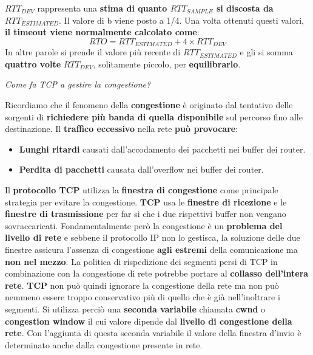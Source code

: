 \documentclass[11pt,a4paper]{article}
\theoremstyle{definition}
\begin{document}
$RTT_{DEV}$ rappresenta una \textbf{stima di quanto $RTT_{SAMPLE}$ si discosta da $RTT_{ESTIMATED}$}. Il valore di b viene posto a 1/4. Una volta ottenuti questi valori, \textbf{il timeout viene normalmente calcolato come}:
\begin{equation}
	RTO = RTT_{ESTIMATED} + 4 \times RTT_{DEV}
\end{equation}
In altre parole si prende il valore più recente di $RTT_{ESTIMATED}$ e gli si somma \textbf{quattro volte} $RTT_{DEV}$, solitamente piccolo, per \textbf{equilibrarlo}.
\newpage
\begin{flushleft}
	\textit{Come fa TCP a gestire la congestione?}
\end{flushleft}
Ricordiamo che il fenomeno della \textbf{congestione} è originato dal tentativo delle
sorgenti di \textbf{richiedere più banda di quella disponibile} sul percorso fino alle destinazione.\newline
Il \textbf{traffico eccessivo} nella rete \textbf{può provocare}:
\begin{itemize}
	\item \textbf{Lunghi ritardi} causati dall'accodamento dei pacchetti nei buffer dei router.
	\item \textbf{Perdita di pacchetti} causata dall'overflow nei buffer dei router.
\end{itemize}
Il \textbf{protocollo TCP} utilizza la \textbf{finestra di congestione} come principale strategia per evitare la congestione.\newline\newline
\textbf{TCP} usa le \textbf{finestre di ricezione} e le \textbf{finestre di trasmissione} per far sì che i due rispettivi buffer non vengano sovraccaricati. Fondamentalmente però la congestione è un \textbf{problema del livello di rete} e sebbene il protocollo IP non lo gestisca, la soluzione delle due finestre assicura l'assenza di congestione \textbf{agli estremi} della comunicazione ma \textbf{non nel mezzo}. La politica di rispedizione dei segmenti persi di TCP in combinazione con la congestione di rete potrebbe portare al \textbf{collasso dell'intera rete}.
\textbf{TCP} non può quindi ignorare la congestione della rete ma non può nemmeno essere troppo conservativo più di quello che è già nell'inoltrare i segmenti. Si utilizza perciò una \textbf{seconda variabile} chiamata \textbf{cwnd} o \textbf{congestion window} il cui valore dipende dal \textbf{livello di congestione della rete}. Con l'aggiunta di questa seconda variabile il valore della finestra d'invio è determinato anche dalla congestione presente in rete.
\end{document}
